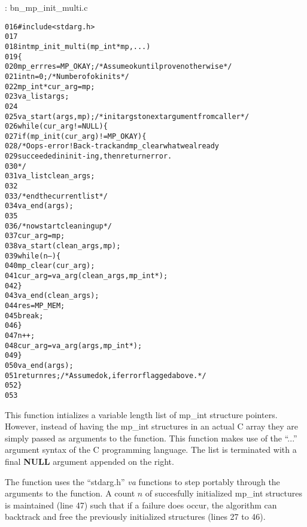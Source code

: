 \documentclass[b5paper]{book}
\begin{document}
\vspace{+3mm}\begin{small}
\hspace{-5.1mm}{\bf File}: bn\_mp\_init\_multi.c
\vspace{-3mm}
\begin{alltt}
016   #include <stdarg.h>
017   
018   int mp_init_multi(mp_int *mp, ...) 
019   \{
020       mp_err res = MP_OKAY;      /* Assume ok until proven otherwise */
021       int n = 0;                 /* Number of ok inits */
022       mp_int* cur_arg = mp;
023       va_list args;
024   
025       va_start(args, mp);        /* init args to next argument from caller */
026       while (cur_arg != NULL) \{
027           if (mp_init(cur_arg) != MP_OKAY) \{
028               /* Oops - error! Back-track and mp_clear what we already
029                  succeeded in init-ing, then return error.
030               */
031               va_list clean_args;
032               
033               /* end the current list */
034               va_end(args);
035               
036               /* now start cleaning up */            
037               cur_arg = mp;
038               va_start(clean_args, mp);
039               while (n--) \{
040                   mp_clear(cur_arg);
041                   cur_arg = va_arg(clean_args, mp_int*);
042               \}
043               va_end(clean_args);
044               res = MP_MEM;
045               break;
046           \}
047           n++;
048           cur_arg = va_arg(args, mp_int*);
049       \}
050       va_end(args);
051       return res;                /* Assumed ok, if error flagged above. */
052   \}
053   
\end{alltt}
\end{small}

This function intializes a variable length list of mp\_int structure pointers.  However, instead of having the mp\_int
structures in an actual C array they are simply passed as arguments to the function.  This function makes use of the 
``...'' argument syntax of the C programming language.  The list is terminated with a final \textbf{NULL} argument 
appended on the right.  

The function uses the ``stdarg.h'' \textit{va} functions to step portably through the arguments to the function.  A count
$n$ of succesfully initialized mp\_int structures is maintained (line 47) such that if a failure does occur,
the algorithm can backtrack and free the previously initialized structures (lines 27 to 46).  
\end{document}
